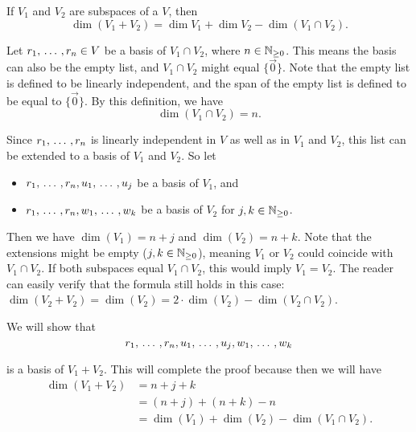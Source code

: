 \begin{thm} 
\label{thm: dimension of a sum of subspaces}
If $V_1$ and $V_2$ are subspaces of a \fdvs $V$, then
\begin{equation}
  \dim (V_1 + V_2) = \dim V_1 + \dim V_2 - \dim (V_1 \cap V_2).
\end{equation}
\end{thm}
\begin{prf}
Let $r_1, {\, \ldots \,\,}, r_n \in V$ be a basis of $V_1 \cap V_2$, where $n \in \mathbb{N}_{\geq 0}$. This means the basis can also be the empty list, and $V_1 \cap V_2$ might equal $\{ \vec 0 \}$. Note that the empty list is defined to be linearly independent, and the span of the empty list is defined to be equal to $\{ \vec 0 \}$. By this definition, we have
\[
\dim(V_1 \cap V_2) = n.
\]

Since $r_1, {\, \ldots \,\,}, r_n$ is linearly independent in $V$ as well as in $V_1$ and $V_2$, this list can be extended to a basis of $V_1$ and $V_2$. So let
\begin{itemize}
  \item $r_1, {\, \ldots \,\,}, r_n, u_1, {\, \ldots \,\,}, u_j$ be a basis of $V_1$, and
  \item $r_1, {\, \ldots \,\,}, r_n, w_1, {\, \ldots \,\,}, w_k$ be a basis of $V_2$ for $j,k \in \mathbb{N}_{\geq 0}$.
\end{itemize}

Then we have $\dim (V_1) = n+j$ and $\dim(V_2) = n+k$. Note that the extensions might be empty ($j,k \in \mathbb{N}_{\geq 0}$), meaning $V_1$ or $V_2$ could coincide with $V_1 \cap V_2$. If both subspaces equal $V_1 \cap V_2$, this would imply $V_1 = V_2$. The reader can easily verify that the formula still holds in this case: $\dim (V_2+V_2) = \dim (V_2) = 2 \cdot \dim (V_2) - \dim (V_2 \cap V_2)$.

We will show that
\begin{equation}
  \label{eq: basis with r's, u's and w's}
  r_1, {\, \ldots \,\,}, r_n, u_1, {\, \ldots \,\,}, u_j, w_1, {\, \ldots \,\,}, w_k
\end{equation}

is a basis of $V_1 + V_2$. This will complete the proof because then we will have
\begin{equation}
  \begin{aligned}
    \dim (V_1 + V_2) &= n + j + k \\
    &= (n+j) + (n+k) - n \\
    &= \dim (V_1) + \dim (V_2) - \dim (V_1 \cap V_2).
  \end{aligned}
\end{equation}


\end{prf}
